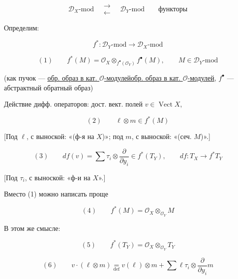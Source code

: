\documentclass[11pt]{article}
\theoremstyle{definition}
\theoremstyle{remark}
\let\DiplomaticMathUnderline\underline
\renewcommand{\underline}[1]{\ifmmode\DiplomaticMathUnderline{#1}\else\uline{#1}\fi}
\begin{document}
\begin{equation*}
\mathcal{D}_X\text{-}\mathrm{mod}\quad\substack{\longrightarrow\\\longleftarrow}\quad\mathcal{D}_Y\text{-}\mathrm{mod}\qquad\text{функторы}
\end{equation*}

Определим:

\begin{equation*}
f^*:\mathcal{D}_Y\text{-}\mathrm{mod}\longrightarrow\mathcal{D}_X\text{-}\mathrm{mod}
\end{equation*}

\begin{equation*}
(1)\qquad f^*(M)=\mathcal{O}_X\otimes_{f^{\bullet}(\mathcal{O}_Y)}f^{\bullet}(M),\qquad M\in\mathcal{D}_Y\text{-}\mathrm{mod}
\end{equation*}

(как пучок — \underline{обр. образ в кат. $\mathcal{O}$-модулей}, $f^{\bullet}$ — абстрактный обратный образ)

Действие дифф. операторов: дост. вект. полей $v\in\operatorname{Vect}X$,

\begin{equation*}
(2)\qquad \ell\otimes m\in f^*(M)
\end{equation*}

[Под $\ell$, с выноской: «(ф-я на $X$)»; под $m$, с выноской: «(сеч. $M$)».]

\begin{equation*}
(3)\qquad df(v)=\sum\tau_i\otimes\frac{\partial}{\partial y_i}\in f^*(T_Y),\qquad df:T_X\longrightarrow f^*T_Y
\end{equation*}

[Под $\tau_i$, с выноской: «ф-и на $X$».]

Вместо (1) можно написать проще

\begin{equation*}
(4)\qquad f^*(M)=\mathcal{O}_X\otimes_{\mathcal{O}_Y}M
\end{equation*}

В этом же смысле:

\begin{equation*}
(5)\qquad f^*(T_Y)=\mathcal{O}_X\otimes_{\mathcal{O}_Y}T_Y
\end{equation*}

\begin{equation*}
(6)\qquad v\cdot(\ell\otimes m)\underset{\mathrm{def}}{=}v(\ell)\otimes m+\sum\ell\tau_i\otimes\frac{\partial}{\partial y_i}m
\end{equation*}
\end{document}
